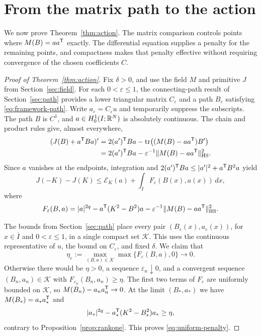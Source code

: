 \section{From the matrix path to the action}\label{sec:action-limit}

We now prove Theorem~\ref{thm:action}. The matrix comparison controls points
where $M(B)=aa^{\mathsf T}$ exactly. The differential equation supplies a
penalty for the remaining points, and compactness makes that penalty
effective without requiring convergence of the chosen coefficients $C$.

\begin{proof}[Proof of Theorem~\ref{thm:action}]
Fix $\delta>0$, and use the field $M$ and primitive $J$ from
Section~\ref{sec:field}. For each $0<\varepsilon\le1$, the connecting-path
result of Section~\ref{sec:path} provides a lower triangular matrix
$C_\varepsilon$ and a path $B_\varepsilon$ satisfying
\eqref{eq:framework-path}. Write $a_\varepsilon=C_\varepsilon u$ and temporarily
suppress the subscripts. The path $B$ is $C^1$, and $a\in H^1_0(I;\mathbb R^N)$
is absolutely continuous. The chain and product rules give, almost everywhere,
\begin{align}
 (J(B)+a^{\mathsf T}Ba)'
 &=2(a')^{\mathsf T}Ba
      -\operatorname{tr}\bigl((M(B)-aa^{\mathsf T})B'\bigr)\notag\\
 &=2(a')^{\mathsf T}Ba
      -\varepsilon^{-1}\|M(B)-aa^{\mathsf T}\|_{\mathrm{HS}}^2.
 \label{eq:action-identity}
\end{align}
Since $a$ vanishes at the endpoints, integration and
$2(a')^{\mathsf T}Ba\le |a'|^2+a^{\mathsf T}B^2a$ yield
\begin{equation}\label{eq:penalty-bound}
 J(-K)-J(K)\le\mathcal E_K(a)
      +\int_I F_\varepsilon(B(x),a(x))\,dx,
\end{equation}
where
\[
 F_\varepsilon(B,a)
 =|a|^{2q}-a^{\mathsf T}(K^2-B^2)a
       -\varepsilon^{-1}\|M(B)-aa^{\mathsf T}\|_{\mathrm{HS}}^2.
\]

The bounds from Section~\ref{sec:path} place every pair
$(B_\varepsilon(x),a_\varepsilon(x))$, for $x\in\overline I$ and
$0<\varepsilon\le1$, in a single compact set $\mathcal K$.
This uses the continuous representative of $u$, the bound on $C_\varepsilon$,
and fixed $\delta$. We claim that
\begin{equation}\label{eq:uniform-penalty}
 \eta_\varepsilon:=\max_{(B,a)\in\mathcal K}
       \max\{F_\varepsilon(B,a),0\}\longrightarrow0.
\end{equation}
Otherwise there would be $\eta>0$, a sequence $\varepsilon_n\downarrow0$,
and a convergent sequence $(B_n,a_n)\in\mathcal K$ with
$F_{\varepsilon_n}(B_n,a_n)\ge\eta$.
The first two terms of $F_\varepsilon$ are uniformly bounded on
$\mathcal K$, so $M(B_n)-a_na_n^{\mathsf T}\to0$.
At the limit $(B_*,a_*)$ we have $M(B_*)=a_*a_*^{\mathsf T}$ and
\[
 |a_*|^{2q}-a_*^{\mathsf T}(K^2-B_*^2)a_*\ge\eta,
\]
contrary to Proposition~\ref{prop:rankone}. This proves
\eqref{eq:uniform-penalty}.


\end{proof}
